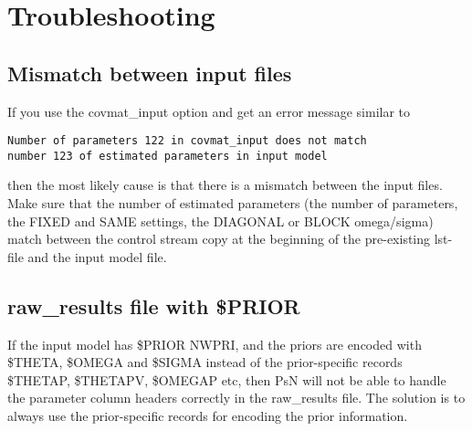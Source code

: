 \section{Troubleshooting}
\subsection*{Mismatch between input files}
If you use the covmat\_input option and get an error message similar to
\begin{verbatim}
Number of parameters 122 in covmat_input does not match 
number 123 of estimated parameters in input model
\end{verbatim}
then the most likely cause is that there is a mismatch between the input files. Make sure that the number of
estimated parameters (the number of parameters, the FIXED and SAME settings, the DIAGONAL or BLOCK omega/sigma)
match between the control stream copy at the beginning of the pre-existing lst-file and the input model file.
\subsection*{raw\_results file with \$PRIOR}
If the input model has \$PRIOR NWPRI, and the priors are encoded with \$THETA, \$OMEGA and \$SIGMA instead of the
prior-specific records \$THETAP, \$THETAPV, \$OMEGAP etc, then PsN will not be able to handle the parameter column
headers correctly in the raw\_results file. The solution is to always use the prior-specific records for
encoding the prior information.


